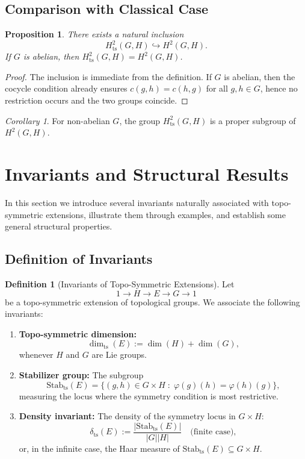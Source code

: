 \documentclass[11pt,a4paper]{article}
\theoremstyle{plain}
\newtheorem{proposition}[theorem]{Proposition}
\theoremstyle{definition}
\newtheorem{definition}[theorem]{Definition}
\theoremstyle{remark}
\newtheorem{corollary}{Corollary}[section]
\begin{document}
	\subsection{Comparison with Classical Case}
	
	\begin{proposition}
		There exists a natural inclusion
		\[
		H^2_{\mathrm{ts}}(G,H) \hookrightarrow H^2(G,H).
		\]
		If $G$ is abelian, then $H^2_{\mathrm{ts}}(G,H) = H^2(G,H)$.  
	\end{proposition}
	
	\begin{proof}
		The inclusion is immediate from the definition.  
		If $G$ is abelian, then the cocycle condition already ensures $c(g,h) = c(h,g)$ for all $g,h \in G$, hence no restriction occurs and the two groups coincide.  
	\end{proof}
	
	\begin{corollary}
		For non-abelian $G$, the group $H^2_{\mathrm{ts}}(G,H)$ is a proper subgroup of $H^2(G,H)$.  
	\end{corollary}
	
	
	\section{Invariants and Structural Results}
	
	In this section we introduce several invariants naturally associated with topo-symmetric extensions, illustrate them through examples, and establish some general structural properties.
	
	\subsection{Definition of Invariants}
	
	\begin{definition}[Invariants of Topo-Symmetric Extensions]
		Let 
		\[
		1 \to H \to E \to G \to 1
		\]
		be a topo-symmetric extension of topological groups.
		We associate the following invariants:
		
		\begin{enumerate}
			\item \textbf{Topo-symmetric dimension:}  
			\[
			\dim_{\mathrm{ts}}(E) := \dim(H) + \dim(G),
			\]
			whenever $H$ and $G$ are Lie groups.  
			
			\item \textbf{Stabilizer group:}  
			The subgroup
			\[
			\mathrm{Stab}_{\mathrm{ts}}(E) = \{ (g,h) \in G \times H \; : \; \varphi(g)(h) = \varphi(h)(g)\},
			\]
			measuring the locus where the symmetry condition is most restrictive.  
			
			\item \textbf{Density invariant:}  
			The density of the symmetry locus in $G \times H$:
			\[
			\delta_{\mathrm{ts}}(E) := \frac{|\mathrm{Stab}_{\mathrm{ts}}(E)|}{|G||H|}
			\quad \text{(finite case)}, 
			\]
			or, in the infinite case, the Haar measure of $\mathrm{Stab}_{\mathrm{ts}}(E) \subseteq G \times H$.  
		\end{enumerate}
	\end{definition}
	
\end{document}
